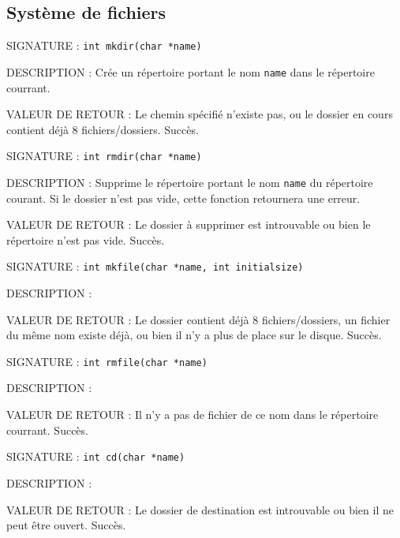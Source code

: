 \documentclass{article}
\begin{document}
	\subsection{Système de fichiers}
		\begin{description}
			\item{SIGNATURE : } \texttt{int mkdir(char *name)}
			\item{DESCRIPTION : } Crée un répertoire portant le nom \texttt{name} dans le répertoire courrant.
			\item{VALEUR DE RETOUR : } 
				 Le chemin spécifié n'existe pas, ou le dossier en cours contient déjà 8 fichiers/dossiers.
				 Succès.
		\end{description}
		\vspace{2.5mm}
		\begin{description}
			\item{SIGNATURE : } \texttt{int rmdir(char *name)}
			\item{DESCRIPTION : } Supprime le répertoire portant le nom \texttt{name} du répertoire courant. Si le dossier n'est pas vide, cette fonction retournera une erreur.
			\item{VALEUR DE RETOUR : } 
				 Le dossier à supprimer est introuvable ou bien le répertoire n'est pas vide.
				\subitem{\texttt{1} : } Succès.
		\end{description}
		\vspace{2.5mm}
		\begin{description}
			\item{SIGNATURE : } \texttt{int mkfile(char *name, int initialsize)}
			\item{DESCRIPTION : } 
			\item{VALEUR DE RETOUR : } 
				 Le dossier contient déjà 8 fichiers/dossiers, un fichier du même nom existe déjà, ou bien il n'y a plus de place sur le disque.
				 Succès.
		\end{description}
		\vspace{2.5mm}
		\begin{description}
			\item{SIGNATURE : } \texttt{int rmfile(char *name)}
			\item{DESCRIPTION : } 
			\item{VALEUR DE RETOUR : } 
				 Il n'y a pas de fichier de ce nom dans le répertoire courrant.
				\subitem{\texttt{1} : } Succès.
		\end{description}
		\vspace{2.5mm}
		\begin{description}
			\item{SIGNATURE : } \texttt{int cd(char *name)}
			\item{DESCRIPTION : } 
			\item{VALEUR DE RETOUR : } 
				 Le dossier de destination est introuvable ou bien il ne peut être ouvert.
				 Succès.
		\end{description}
		\vspace{2.5mm}
	
\end{document}
